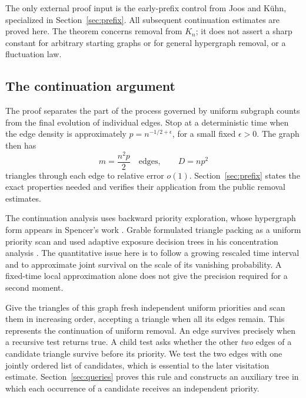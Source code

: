 The only external proof input is the early-prefix control from
Joos and K\"uhn, specialized in Section~\ref{sec:prefix}. All subsequent
continuation estimates are proved here. The theorem concerns removal
from $K_n$; it does not assert a sharp constant for arbitrary starting
graphs or for general hypergraph removal, or a fluctuation law.

\subsection{The continuation argument}

The proof separates the part of the process governed by uniform subgraph
counts from the final evolution of individual edges. Stop at a deterministic
time when the edge density is approximately $p=n^{-1/2+\epsilon}$, for a
small fixed $\epsilon>0$. The graph then has
\[
 m=\frac{n^2p}{2}\quad\text{edges},\qquad D=np^2
\]
triangles through each edge to relative error $o(1)$.
Section~\ref{sec:prefix} states the exact properties needed and verifies
their application from the public removal estimates.

The continuation analysis uses backward priority exploration, whose
hypergraph form appears in Spencer's work
\cite[Sections~2--4]{Spencer1995}. Grable formulated triangle packing
as a uniform priority scan and used adaptive exposure decision trees in
his concentration analysis
\cite[Sections~1 and~4]{Grable1997}. The quantitative issue here is to
follow a growing rescaled time interval and to approximate joint survival
on the scale of its vanishing probability. A fixed-time local
approximation alone does not give the precision required for a second
moment.

Give the triangles of this graph fresh independent uniform priorities and
scan them in increasing order, accepting a triangle when all its edges
remain. This represents the continuation of uniform removal. An edge
survives precisely when a recursive test returns true. A child test asks
whether the other \emph{two} edges of a candidate triangle survive before
its priority. We test the two edges with one jointly ordered list of
candidates, which is essential to the later visitation estimate.
Section~\ref{sec:queries} proves this rule and constructs
an auxiliary tree in which each occurrence of a candidate receives an
independent priority.

